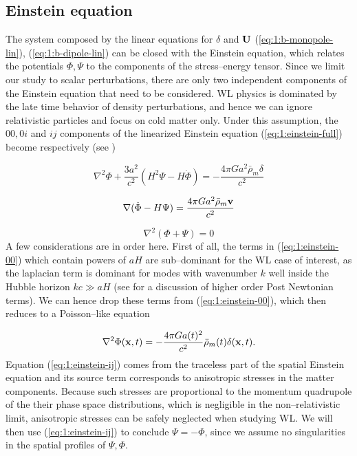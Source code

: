 \subsection{Einstein equation}
The system composed by the linear equations for $\delta$ and $\mathbf{U}$ (\ref{eq:1:b-monopole-lin}), (\ref{eq:1:b-dipole-lin}) can be closed with the Einstein equation, which relates the potentials $\Phi,\Psi$ to the components of the stress--energy tensor. Since we limit our study to scalar perturbations, there are only two independent components of the Einstein equation that need to be considered. WL physics is dominated by the late time behavior of density perturbations, and hence we can ignore relativistic particles and focus on cold matter only. Under this assumption, the $00,0i$ and $ij$ components of the linearized Einstein equation (\ref{eq:1:einstein-full}) become respectively (see \citep{Dodelson-C5})

\begin{equation}
\label{eq:1:einstein-00}
\nabla^2\Phi +\frac{3a^2}{c^2}(H^2\Psi-H\dot{\Phi}) = -\frac{4\pi Ga^2\bar{\rho}_m\delta}{c^2}
\end{equation}

\begin{equation}
\label{eq:1:einstein-0i}
\nabla(\dot{\Phi}-H\Psi) = \frac{4\pi Ga^2\bar{\rho}_m\mathbf{v}}{c^2}
\end{equation}

\begin{equation}
\label{eq:1:einstein-ij}
\nabla^2(\Phi+\Psi) = 0
\end{equation}
%
A few considerations are in order here. First of all, the terms in (\ref{eq:1:einstein-00}) which contain powers of $aH$ are sub--dominant for the WL case of interest, as the laplacian term is dominant for modes with wavenumber $k$ well inside the Hubble horizon $kc\gg aH$ (see \citep{PNLensing} for a discussion of higher order Post Newtonian terms). We can hence drop these terms from (\ref{eq:1:einstein-00}), which then reduces to a Poisson--like equation 

\begin{equation}
\label{eq:1:poisson}
\nabla^2\Phi(\mathbf{x},t) = -\frac{4\pi Ga(t)^2}{c^2}\bar{\rho}_m(t)\delta(\mathbf{x},t).
\end{equation}
%
Equation (\ref{eq:1:einstein-ij}) comes from the traceless part of the spatial Einstein equation and its source term corresponds to anisotropic stresses in the matter components. Because such stresses are proportional to the momentum quadrupole of the their phase space distributions, which is negligible in the non--relativistic limit, anisotropic stresses can be safely neglected when studying WL. We will then use (\ref{eq:1:einstein-ij}) to conclude $\Psi=-\Phi$, since we assume no singularities in the spatial profiles of $\Psi,\Phi$.  

